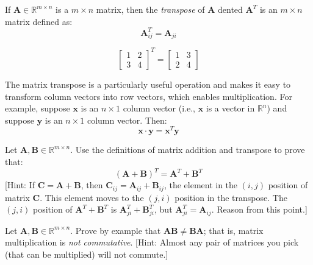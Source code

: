\begin{definition} If $\mathbf{A} \in \mathbb{R}^{m \times n}$ is a $m \times n$ matrix, then the \textit{transpose} of $\mathbf{A}$ dented $\mathbf{A}^T$ is an $m \times n$ matrix defined as:
\begin{equation}
\mathbf{A}^T_{ij} = \mathbf{A}_{ji}
\end{equation}
\end{definition}
\begin{example}
\begin{equation}
\left[
\begin{array}{cc}
1 & 2\\
3 & 4
\end{array}
\right]^T = 
\left[
\begin{array}{cc}
1 & 3\\
2 & 4
\end{array}
\right] 
\end{equation}
\end{example}

The matrix transpose is a particularly useful operation and makes it easy to transform column vectors into row vectors, which enables multiplication. For example, suppose $\mathbf{x}$ is an $n \times 1$ column vector (i.e., $\mathbf{x}$ is a vector in $\mathbb{R}^n$) and suppose $\mathbf{y}$ is an $n \times 1$ column vector. Then:
\begin{equation}
\mathbf{x} \cdot \mathbf{y} = \mathbf{x}^T\mathbf{y}
\end{equation}

\begin{exercise} Let $\mathbf{A}, \mathbf{B} \in \mathbb{R}^{m \times n}$. Use the definitions of matrix addition and transpose to prove that:
\begin{equation}
(\mathbf{A} + \mathbf{B})^T = \mathbf{A}^T + \mathbf{B}^T
\end{equation}
[Hint: If $\mathbf{C} = \mathbf{A} + \mathbf{B}$, then $\mathbf{C}_{ij} = \mathbf{A}_{ij} + \mathbf{B}_{ij}$, the element in the $(i,j)$ position of matrix $\mathbf{C}$. This element moves to the $(j,i)$ position in the transpose. The $(j,i)$ position of $\mathbf{A}^T + \mathbf{B}^T$ is $\mathbf{A}_{ji}^T + \mathbf{B}^T_{ji}$, but $\mathbf{A}_{ji}^T = \mathbf{A}_{ij}$. Reason from this point.] 
\label{exer:AdditionTranspose}
\end{exercise}

\begin{exercise} Let $\mathbf{A}, \mathbf{B} \in \mathbb{R}^{m \times n}$. Prove by example that $\mathbf{A}\mathbf{B} \neq \mathbf{B}\mathbf{A}$; that is, matrix multiplication is \textit{not commutative}. [Hint: Almost any pair of matrices you pick (that can be multiplied) will not commute.]
\end{exercise}


